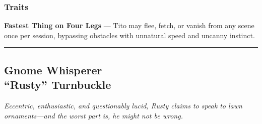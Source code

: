 \begin{paracol}{3}
    \subsubsection{Traits}
      \textbf{Fastest Thing on Four Legs} — Tito may flee, fetch, or vanish from any scene once per session, bypassing obstacles with unnatural speed and uncanny instinct.
\end{paracol}
\vspace{.5\baselineskip}
\hrule
\vspace{.5\baselineskip}

\subsection{{\small Gnome Whisperer}\\ “Rusty” Turnbuckle}
\label{npc:rusty-turnbuckle}

\emph{Eccentric, enthusiastic, and questionably lucid, Rusty claims to speak to lawn ornaments—and the worst part is, he might not be wrong.}
\vspace{.5\baselineskip}

